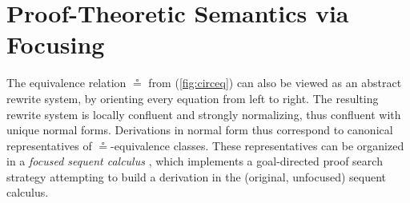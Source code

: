 \documentclass[copyright,creativecommons]{eptcs}
\theoremstyle{definition}
\newcommand{\FSkMCC}{\mathsf{Free}}
\begin{document}

\section{Proof-Theoretic Semantics via Focusing}
\label{sec:focus}
The equivalence relation $\circeq$ from (\ref{fig:circeq}) can also be viewed as an abstract rewrite system, by orienting every equation from left to right. The resulting rewrite system is locally confluent and strongly normalizing, thus confluent with unique normal forms. Derivations in normal form thus correspond to canonical representatives of $\circeq$-equivalence classes.
These representatives can be organized in a \emph{focused sequent calculus} \cite{andreoli:logic:1992}, which implements a goal-directed proof search strategy attempting to build a derivation in the (original, unfocused) sequent calculus.
\end{document}
